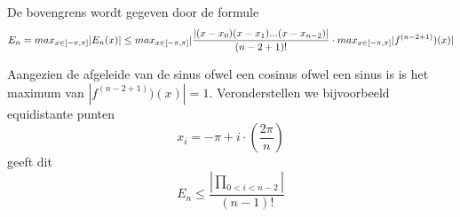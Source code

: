 De bovengrens wordt gegeven door de formule
\[
E_n = max_{x \in [- \pi, \pi]}|E_n(x)| \\
\leq max_{x \in [- \pi, \pi]} |\frac{|(x-x_0)(x-x_1)...(x-x_{n-2})|}{(n-2+1)!} \cdot max_{x \in [- \pi, \pi]}|f^{(n-2+1)})(x)|
\]

Aangezien de afgeleide van de sinus ofwel een cosinus ofwel een sinus is is het maximum van $|f^{(n-2+1)})(x)| = 1$.
Veronderstellen we bijvoorbeeld equidistante punten
\[
x_i = -\pi + i \cdot (\frac{2\pi}{n})
\]
geeft dit
\[
E_n \leq \frac{|\prod_{0<i<n-2}|}{(n-1)!}
\]
